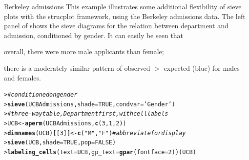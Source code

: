 \documentclass[10pt,krantz2]{krantz}\usepackage[]{graphicx}\usepackage[]{color}
\makeatletter
\newcommand{\hlnum}[1]{\textcolor[rgb]{0.686,0.059,0.569}{#1}}%
\newcommand{\hlstr}[1]{\textcolor[rgb]{0.192,0.494,0.8}{#1}}%
\newcommand{\hlcom}[1]{\textcolor[rgb]{0.678,0.584,0.686}{\textit{#1}}}%
\newcommand{\hlstd}[1]{\textcolor[rgb]{0.345,0.345,0.345}{#1}}%
\newcommand{\hlkwb}[1]{\textcolor[rgb]{0.69,0.353,0.396}{#1}}%
\newcommand{\hlkwc}[1]{\textcolor[rgb]{0.333,0.667,0.333}{#1}}%
\newcommand{\hlkwd}[1]{\textcolor[rgb]{0.737,0.353,0.396}{\textbf{#1}}}%
\newenvironment{kframe}{%
 \def\at@end@of@kframe{}%
 \ifinner\ifhmode%
  \def\at@end@of@kframe{\end{minipage}}%
  \begin{minipage}{\columnwidth}%
 \fi\fi%
 \def\FrameCommand##1{\hskip\@totalleftmargin \hskip-\fboxsep
 \colorbox{shadecolor}{##1}\hskip-\fboxsep
     \hskip-\linewidth \hskip-\@totalleftmargin \hskip\columnwidth}%
 \MakeFramed {\advance\hsize-\width
   \@totalleftmargin\z@ \linewidth\hsize
   \@setminipage}}%
 {\par\unskip\endMakeFramed%
 \at@end@of@kframe}
\newenvironment{knitrout}{}{} %
\renewenvironment{knitrout}{\small\renewcommand{\baselinestretch}{.85}}{} %
\makeatother
\begin{document}
\begin{Example}[berkeley3]{Berkeley admissions}
This example illustrates some additional flexibility of sieve plots
with the strucplot framework, using the Berkeley admissions data.
The left panel of  shows the sieve diagrams for
the relation between department and admission, conditioned by gender.
It can easily be seen that
\begin{seriate}
  \item overall, there were more male applicants than female;
  \item there is a moderately similar pattern of observed $>$ expected (blue)
  for males and females.
\end{seriate}
\begin{knitrout}
\color{fgcolor}\begin{kframe}
\begin{alltt}
\hlstd{> }\hlcom{# conditioned on gender}
\hlstd{> }\hlkwd{sieve}\hlstd{(UCBAdmissions,} \hlkwc{shade}\hlstd{=}\hlnum{TRUE}\hlstd{,} \hlkwc{condvar}\hlstd{=}\hlstr{'Gender'}\hlstd{)}
\hlstd{> }\hlcom{# three-way table, Department first, with cell labels}
\hlstd{> }\hlstd{UCB} \hlkwb{<-} \hlkwd{aperm}\hlstd{(UCBAdmissions,} \hlkwd{c}\hlstd{(}\hlnum{3}\hlstd{,}\hlnum{1}\hlstd{,}\hlnum{2}\hlstd{))}
\hlstd{> }\hlkwd{dimnames}\hlstd{(UCB)[[}\hlnum{3}\hlstd{]]} \hlkwb{<-} \hlkwd{c}\hlstd{(}\hlstr{"M"}\hlstd{,} \hlstr{"F"}\hlstd{)}   \hlcom{# abbreviate for display}
\hlstd{> }\hlkwd{sieve}\hlstd{(UCB,} \hlkwc{shade}\hlstd{=}\hlnum{TRUE}\hlstd{,} \hlkwc{pop}\hlstd{=}\hlnum{FALSE}\hlstd{)}
\hlstd{> }\hlkwd{labeling_cells}\hlstd{(}\hlkwc{text} \hlstd{= UCB,} \hlkwc{gp_text} \hlstd{=} \hlkwd{gpar}\hlstd{(}\hlkwc{fontface} \hlstd{=} \hlnum{2}\hlstd{))(UCB)}
\end{alltt}
\end{kframe}\begin{figure}[!htbp]


\end{figure}
\end{knitrout}
\end{Example}
\end{document}
